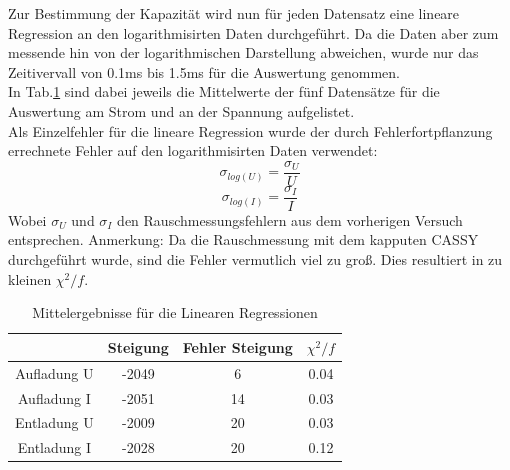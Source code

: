 \documentclass[12pt,a4paper]{article}
\begin{document}
Zur Bestimmung der Kapazität wird nun für jeden Datensatz eine lineare Regression an den logarithmisirten Daten durchgeführt. Da die Daten aber zum messende hin von der logarithmischen Darstellung abweichen, wurde nur das Zeitivervall von 0.1ms bis 1.5ms für die Auswertung genommen.\\
In Tab.\ref{tab:kond_linreg} sind dabei jeweils die Mittelwerte der fünf Datensätze für die Auswertung am Strom und an der Spannung aufgelistet.\\
Als Einzelfehler für die lineare Regression wurde der durch Fehlerfortpflanzung errechnete Fehler auf den logarithmisirten Daten verwendet:
\begin{equation}
\sigma_{log(U)} = \dfrac{\sigma_U}{U}
\end{equation}
\begin{equation}
\sigma_{log(I)} = \dfrac{\sigma_I}{I}
\end{equation}
Wobei $\sigma_U$ und $\sigma_I$ den Rauschmessungsfehlern aus dem vorherigen Versuch entsprechen.
Anmerkung: Da die Rauschmessung mit dem kapputen CASSY durchgeführt wurde, sind die Fehler vermutlich viel zu groß. Dies resultiert in zu kleinen $\chi ^{2}/f$.

\begin{table}
\begin{tabular}{|c|c|c|c|}
\hline 
 & Steigung & Fehler Steigung & $\chi ^{2}/f$ \\ 
\hline 
Aufladung U & -2049 & 6 & 0.04 \\ 
\hline 
Aufladung I  & -2051 & 14 & 0.03 \\ 
\hline 
Entladung U & -2009 & 20 & 0.03 \\ 
\hline 
Entladung I  & -2028 & 20 & 0.12 \\ 
\hline 
\end{tabular} 
\caption{Mittelergebnisse für die Linearen Regressionen}
\label{tab:kond_linreg} 
\end{table}
\end{document}
